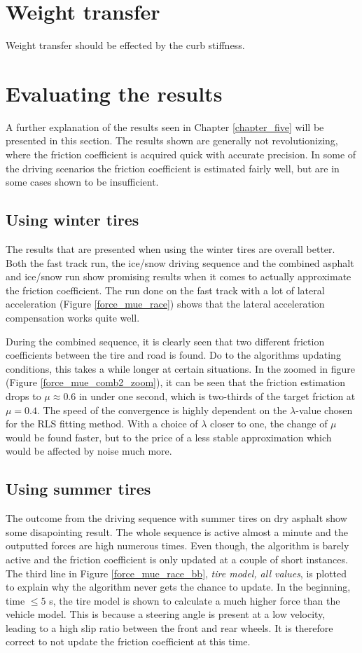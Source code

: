 \section{Weight transfer}
Weight transfer should be effected by the curb stiffness. 


\section{Evaluating the results}

A further explanation of the results seen in Chapter \ref{chapter_five} will be presented in this section. The results shown are generally not revolutionizing, where the friction coefficient is acquired quick with accurate precision. In some of the driving scenarios the friction coefficient is estimated fairly well, but are in some cases shown to be insufficient. 

\subsection{Using winter tires}
The results that are presented when using the winter tires are overall better. Both the fast track run, the ice/snow driving sequence and the combined asphalt and ice/snow run show promising results when it comes to actually approximate the friction coefficient. The run done on the fast track with a lot of lateral acceleration (Figure \ref{force_mue_race}) shows that the lateral acceleration compensation works quite well. 

During the combined sequence, it is clearly seen that two different friction coefficients between the tire and road is found. Do to the algorithms updating conditions, this takes a while longer at certain situations. In the zoomed in figure (Figure \ref{force_mue_comb2_zoom}), it can be seen that the friction estimation drops to $ \mu \approx 0.6 $ in under one second, which is two-thirds of the target friction at $ \mu = 0.4 $. The speed of the convergence is highly dependent on the $ \lambda $-value chosen for the RLS fitting method. With a choice of $ \lambda $ closer to one, the change of $ \mu $ would be found faster, but to the price of a less stable approximation which would be affected by noise much more. 

\subsection{Using summer tires}
The outcome from the driving sequence with summer tires on dry asphalt show some disapointing result. The whole sequence is active almost a minute and the outputted forces are high numerous times. Even though, the algorithm is barely active and the friction coefficient is only updated at a couple of short instances. The third line in Figure \ref{force_mue_race_bb}, \textit{tire model, all values}, is plotted to explain why the algorithm never gets the chance to update. In the beginning, time $ \leq 5 $ s, the tire model is shown to calculate a much higher force than the vehicle model. This is because a steering angle is present at a low velocity, leading to a high slip ratio between the front and rear wheels. It is therefore correct to not update the friction coefficient at this time. 

